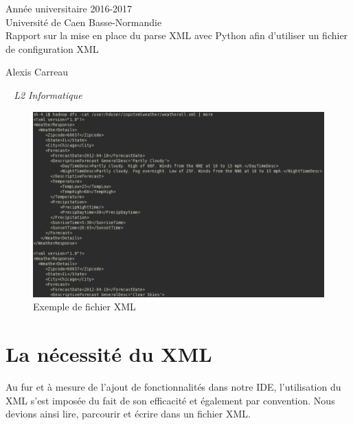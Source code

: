 \documentclass[a4paper,12pt]{article}
\begin{document}
\begin{titlepage}
	\begin{center}
		\Large{Année universitaire 2016-2017}\\
		\Large{Université de Caen Basse-Normandie}\\[1cm]
		
		\huge{Rapport sur la mise en place du parse XML avec Python afin d'utiliser un fichier de configuration XML}\\
		\vspace{3cm}
		
		Alexis Carreau
		
	\normalsize{\textit{ ~ L2 Informatique}}\\
		\medskip
		\vspace{2cm}
		
	\begin{figure}[h!]
			\begin{center}
				\includegraphics[scale=0.7]{images/intro.png}
				\caption{Exemple de fichier XML}
			\end{center}
		\end{figure}
				
	\end{center}
\end{titlepage}

\tableofcontents
\newpage

\section{La nécessité du XML}

Au fur et à mesure de l'ajout de fonctionnalités dans notre IDE, l'utilisation du XML s'est imposée du fait de son efficacité et également par convention. Nous devions ainsi lire, parcourir et écrire dans un fichier XML.
	
\end{document}

